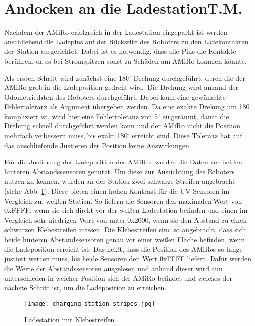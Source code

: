 \section[Andocken an die Ladestation]{Andocken an die Ladestation\hfill {\normalsize T.M.}}\label{kap:andocken_ladestation} %
Nachdem der AMiRo erfolgreich in der Ladestation eingeparkt ist werden anschließend die Ladepins auf der Rückseite des Roboters zu den Ladekontakten der Station ausgerichtet. Dabei ist es notwendig, dass alle Pins die Kontakte berühren, da es bei Stromspitzen sonst zu Schäden am AMiRo kommen könnte.

Als ersten Schritt wird zunächst eine 180$^\circ$ Drehung durchgeführt, durch die der AMiRo grob in die Ladeposition gedreht wird. Die Drehung wird anhand der Odometriedaten des Roboters durchgeführt. Dabei kann eine gewünschte Fehlertoleranz als Argument übergeben werden. Da eine exakte Drehung um 180$^\circ$ kompliziert ist, wird hier eine Fehlertoleranz von 5$^\circ$ eingeräumt, damit die Drehung schnell durchgeführt werden kann und der AMiRo nicht die Position mehrfach verbessern muss, bis exakt 180$^\circ$ erreicht sind. Diese Toleranz hat auf das anschließende Justieren der Position keine Auswirkungen.

Für die Justierung der Ladeposition des AMiRos werden die Daten der beiden hinteren Abstandssensoren genutzt. Um diese zur Ausrichtung des Roboters nutzen zu können, wurden an der Station zwei schwarze Streifen angebracht (siehe Abb. \ref{fig:charging_station}). Diese bieten einen hohen Kontrast für die UV-Sensoren im Vergleich zur weißen Station. So liefern die Sensoren den maximalen Wert von 0xFFFF, wenn sie sich direkt vor der weißen Ladestation befinden und einen im Vergleich sehr niedrigen Wert von unter 0x2000, wenn sie den Abstand zu einen schwarzen Klebestreifen messen. 
Die Klebestreifen sind so angebracht, dass sich beide hinteren Abstandssensoren genau vor einer weißen Fläche befinden, wenn die Ladeposition erreicht ist. 
Das heißt, dass die Position des AMiRos so lange justiert werden muss, bis beide Sensoren den Wert 0xFFFF liefern. 
Dafür werden die Werte der Abstandssensoren ausgelesen und anhand dieser wird nun unterschieden in welcher Position sich der AMiRo befindet und welches der nächste Schritt ist, um die Ladeposition zu erreichen. 

\begin{figure}[]
	\begin{center}
		\texttt{[image: charging\_station\_stripes.jpg]} 	
		\caption{Ladestation mit Klebestreifen}
		\label{fig:charging_station}
	\end{center}
\end{figure}

